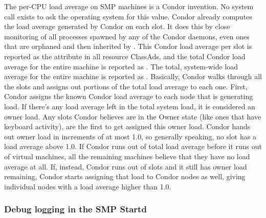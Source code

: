 The per-CPU load average on SMP machines is a Condor invention. 
No system call exists to ask the operating system for this value.
Condor already computes the load average generated by Condor on each
slot.
It does this by close monitoring of all processes spawned by any of the
Condor daemons, even ones that are orphaned and then inherited by
. 
This Condor load average per slot is reported as
the attribute
 in all resource ClassAds, and the total Condor
load average for the entire machine is reported as
. 
The total, system-wide load average for the entire
machine  is reported as .
Basically, Condor walks through all the slots and assigns out
portions of the total load average to each one. 
First, Condor assigns the known Condor load average to each node that
is generating load.  
If there's any load average left in the total system load, it is
considered an owner load.
Any slots Condor believes are in the Owner state (like
ones that have keyboard activity), are the first to get assigned
this owner load.
Condor hands out owner load in increments of at most 1.0, so generally
speaking, no slot has a load average above 1.0.
If Condor runs out of total load average before it runs out of virtual
machines, all the remaining machines believe that they have no load average
at all.
If, instead, Condor runs out of slots and it still has owner
load remaining, Condor starts assigning that load to Condor nodes as
well,
giving individual nodes with a load average higher than 1.0.


\subsubsection{\label{sec:SMP-logging}
Debug logging in the SMP Startd}

